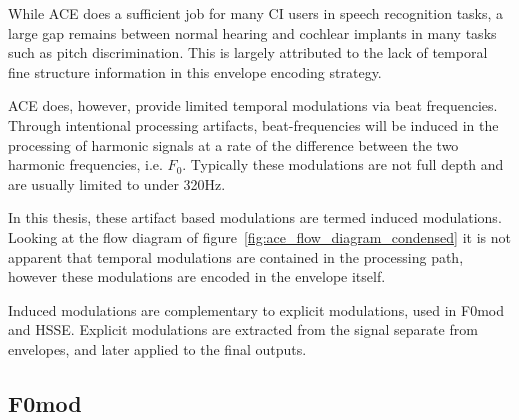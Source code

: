 \documentclass [11pt, proquest,oneside] {ganter_thesis}[2015/03/03]
\begin{document}
While ACE does a sufficient job for many CI users in speech recognition tasks, a large gap remains between normal hearing and cochlear implants in many tasks such as pitch discrimination.  This is largely attributed to the lack of temporal fine structure information in this envelope encoding strategy.




ACE does, however, provide limited temporal modulations via beat frequencies.  Through intentional processing artifacts, beat-frequencies will be induced in the processing of harmonic signals at a rate of the difference between the two harmonic frequencies, i.e. $F_0$.  Typically these modulations are not full depth and are usually limited to under 320Hz.

In this thesis, these artifact based modulations are termed induced modulations.  Looking at the flow diagram of figure~\ref{fig:ace_flow_diagram_condensed} it is not apparent that temporal modulations are contained in the processing path, however these modulations are encoded in the envelope itself.

Induced modulations are complementary to explicit modulations, used in F0mod and HSSE.  Explicit modulations are extracted from the signal separate from envelopes, and later applied to the final outputs.

\subsection{F0mod}
\end{document}
